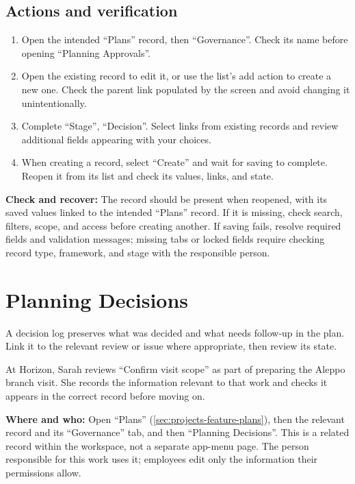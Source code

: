 \subsection{Actions and verification}
\begin{enumerate}
\item Open the intended “Plans” record, then “Governance”. Check its name before opening “Planning Approvals”.
\item Open the existing record to edit it, or use the list's add action to create a new one. Check the parent link populated by the screen and avoid changing it unintentionally.
\item Complete “Stage”, “Decision”. Select links from existing records and review additional fields appearing with your choices.
\item When creating a record, select “Create” and wait for saving to complete. Reopen it from its list and check its values, links, and state.
\end{enumerate}

\textbf{Check and recover:} The record should be present when reopened, with its saved values linked to the intended “Plans” record. If it is missing, check search, filters, scope, and access before creating another. If saving fails, resolve required fields and validation messages; missing tabs or locked fields require checking record type, framework, and stage with the responsible person.

\clearpage
\section{Planning Decisions}
\label{sec:projects-feature-planning-decisions}

A decision log preserves what was decided and what needs follow-up in the plan. Link it to the relevant review or issue where appropriate, then review its state.

\begin{rcnote}
At Horizon, Sarah reviews “Confirm visit scope” as part of preparing the Aleppo branch visit. She records the information relevant to that work and checks it appears in the correct record before moving on.
\end{rcnote}

\textbf{Where and who:} Open “Plans” (\ref{sec:projects-feature-plans}), then the relevant record and its “Governance” tab, and then “Planning Decisions”. This is a related record within the workspace, not a separate app-menu page. The person responsible for this work uses it; employees edit only the information their permissions allow.

